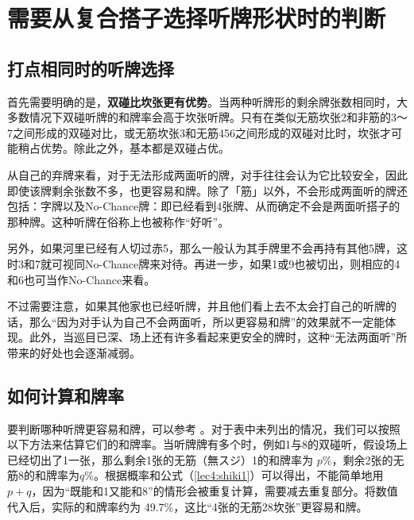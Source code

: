 \chapter[【听牌的技术】听牌的选择]{需要从复合搭子选择听牌形状时的判断}

\section{打点相同时的听牌选择}

首先需要明确的是，\textbf{双碰比坎张更有优势}。当两种听牌形的剩余牌张数相同时，大多数情况下双碰听牌的和牌率会高于坎张听牌。只有在类似无筋坎张2和非筋的3～7之间形成的双碰对比，或无筋坎张3和无筋456之间形成的双碰对比时，坎张才可能稍占优势。除此之外，基本都是双碰占优。

从自己的弃牌来看，对于无法形成两面听的牌，对手往往会认为它比较安全，因此即使该牌剩余张数不多，也更容易和牌。除了「筋」以外，不会形成两面听的牌还包括：字牌以及No-Chance牌：即已经看到4张牌、从而确定不会是两面听搭子的那种牌。这种听牌在俗称上也被称作“好听”。

另外，如果河里已经有人切过赤5，那么一般认为其手牌里不会再持有其他5牌，这时3和7就可视同No-Chance牌来对待。再进一步，如果1或9也被切出，则相应的4和6也可当作No-Chance来看。

不过需要注意，如果其他家也已经听牌，并且他们看上去不太会打自己的听牌的话，那么“因为对手认为自己不会两面听，所以更容易和牌”的效果就不一定能体现。此外，当巡目已深、场上还有许多看起来更安全的牌时，这种“无法两面听”所带来的好处也会逐渐减弱。

\section{如何计算和牌率}
要判断哪种听牌更容易和牌，可以参考
。对于表中未列出的情况，我们可以按照以下方法来估算它们的和牌率。当听牌牌有多个时，例如1与8的双碰听，假设场上已经切出了1一张，那么剩余1张的无筋（無スジ）1的和牌率为 $p$\%，剩余2张的无筋8的和牌率为$q$\%。根据概率和公式（\ref{lec4:shiki1}）可以得出，不能简单地用 $p + q$，因为“既能和1又能和8”的情形会被重复计算，需要减去重复部分。将数值代入后，实际的和牌率约为 49.7\%，这比“4张的无筋28坎张”更容易和牌。

